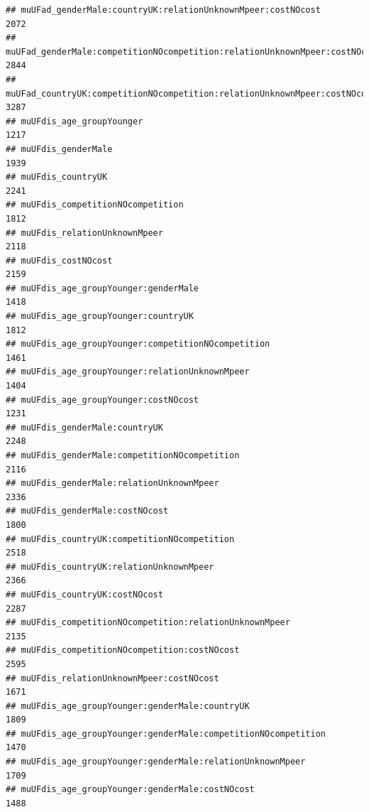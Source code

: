 \documentclass[
]{article}
\begin{document}
\begin{verbatim}
## muUFad_genderMale:countryUK:relationUnknownMpeer:costNOcost                           2072
## muUFad_genderMale:competitionNOcompetition:relationUnknownMpeer:costNOcost            2844
## muUFad_countryUK:competitionNOcompetition:relationUnknownMpeer:costNOcost             3287
## muUFdis_age_groupYounger                                                              1217
## muUFdis_genderMale                                                                    1939
## muUFdis_countryUK                                                                     2241
## muUFdis_competitionNOcompetition                                                      1812
## muUFdis_relationUnknownMpeer                                                          2118
## muUFdis_costNOcost                                                                    2159
## muUFdis_age_groupYounger:genderMale                                                   1418
## muUFdis_age_groupYounger:countryUK                                                    1812
## muUFdis_age_groupYounger:competitionNOcompetition                                     1461
## muUFdis_age_groupYounger:relationUnknownMpeer                                         1404
## muUFdis_age_groupYounger:costNOcost                                                   1231
## muUFdis_genderMale:countryUK                                                          2248
## muUFdis_genderMale:competitionNOcompetition                                           2116
## muUFdis_genderMale:relationUnknownMpeer                                               2336
## muUFdis_genderMale:costNOcost                                                         1800
## muUFdis_countryUK:competitionNOcompetition                                            2518
## muUFdis_countryUK:relationUnknownMpeer                                                2366
## muUFdis_countryUK:costNOcost                                                          2287
## muUFdis_competitionNOcompetition:relationUnknownMpeer                                 2135
## muUFdis_competitionNOcompetition:costNOcost                                           2595
## muUFdis_relationUnknownMpeer:costNOcost                                               1671
## muUFdis_age_groupYounger:genderMale:countryUK                                         1809
## muUFdis_age_groupYounger:genderMale:competitionNOcompetition                          1470
## muUFdis_age_groupYounger:genderMale:relationUnknownMpeer                              1709
## muUFdis_age_groupYounger:genderMale:costNOcost                                        1488

\end{verbatim}
\end{document}

